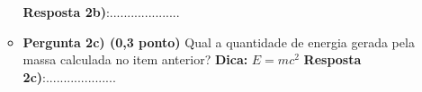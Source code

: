 \documentclass[a4paper, 12pt]{article}
\begin{document}
\begin{flushleft}
\begin{itemize}
\begin{itemize}
						\textbf{Resposta 2b)}:....................
					\item \textbf{Pergunta 2c) (0,3 ponto)} Qual a quantidade de energia gerada pela massa calculada no item anterior? \linebreak
						\textbf{Dica:} $E = m c^2$
						\linebreak \linebreak \linebreak \linebreak \linebreak \linebreak \linebreak \linebreak \linebreak
						\textbf{Resposta 2c)}:....................
				\end{itemize}
				

\end{itemize}
\end{flushleft}
\end{document}
